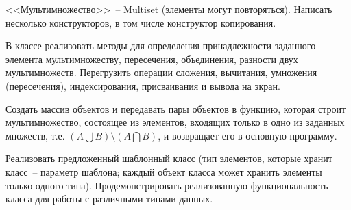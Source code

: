 
<<Мультимножество>>~-- Multiset (элементы могут повторяться). Написать несколько
конструкторов, в том числе конструктор копирования.

В классе реализовать методы для
определения принадлежности заданного элемента мультимножеству, пересечения,
объединения, разности двух мультимножеств. Перегрузить операции сложения,
вычитания, умножения (пересечения), индексирования, присваивания и вывода на экран.

Создать массив объектов и передавать пары объектов в функцию, которая строит
мультимножество, состоящее из элементов, входящих только в одно из заданных
множеств, т.е. $(A\bigcup B) \setminus (A\bigcap B)$, и возвращает его в основную программу.

Реализовать предложенный шаблонный класс (тип элементов, которые
хранит класс~-- параметр шаблона; каждый объект класса может хранить
элементы только одного типа). Продемонстрировать реализованную
функциональность класса для работы с различными типами данных.

